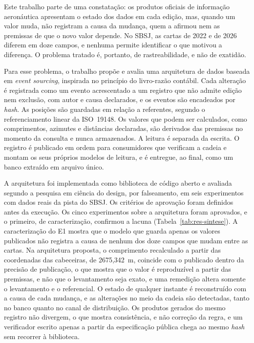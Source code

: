 Este trabalho parte de uma constatação: os produtos oficiais de informação aeronáutica apresentam o estado dos dados em cada edição, mas, quando um valor muda, não registram a causa da mudança, quem a afirmou nem as premissas de que o novo valor depende. No SBSJ, as cartas de 2022 e de 2026 diferem em doze campos, e nenhuma permite identificar o que motivou a diferença. O problema tratado é, portanto, de rastreabilidade, e não de exatidão.

Para esse problema, o trabalho propõe e avalia uma arquitetura de dados baseada em \textit{event sourcing}, inspirada no princípio do livro-razão contábil. Cada alteração é registrada como um evento acrescentado a um registro que não admite edição nem exclusão, com autor e causa declarados, e os eventos são encadeados por \textit{hash}. As posições são guardadas em relação a referentes, segundo o referenciamento linear da ISO~19148. Os valores que podem ser calculados, como comprimentos, azimutes e distâncias declaradas, são derivados das premissas no momento da consulta e nunca armazenados. A leitura é separada da escrita. O registro é publicado em ordem para consumidores que verificam a cadeia e montam os seus próprios modelos de leitura, e é entregue, ao final, como um banco extraído em arquivo único.

A arquitetura foi implementada como biblioteca de código aberto e avaliada segundo a pesquisa em ciência do design, por falseamento, em seis experimentos com dados reais da pista do SBSJ. Os critérios de aprovação foram definidos antes da execução. Os cinco experimentos sobre a arquitetura foram aprovados, e o primeiro, de caracterização, confirmou a lacuna (Tabela~\ref{tab:res-sintese}). A caracterização do E1 mostra que o modelo que guarda apenas os valores publicados não registra a causa de nenhum dos doze campos que mudam entre as cartas. Na arquitetura proposta, o comprimento recalculado a partir das coordenadas das cabeceiras, de 2675,342~m, coincide com o publicado dentro da precisão de publicação, o que mostra que o valor é reproduzível a partir das premissas, e não que o levantamento seja exato, e uma remedição altera somente o levantamento e o referencial. O estado de qualquer instante é reconstruído com a causa de cada mudança, e as alterações no meio da cadeia são detectadas, tanto no banco quanto no canal de distribuição. Os produtos gerados do mesmo registro não divergem, o que mostra consistência, e não correção da regra, e um verificador escrito apenas a partir da especificação pública chega ao mesmo \textit{hash} sem recorrer à biblioteca.

